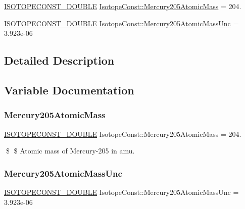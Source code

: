 \begin{DoxyCompactItemize}
\item 
\mbox{\hyperlink{group___isotope_const-_macros_ga8f45a7272ce02c0b4c65c44636ed719a}{I\+S\+O\+T\+O\+P\+E\+C\+O\+N\+S\+T\+\_\+\+D\+O\+U\+B\+LE}} \mbox{\hyperlink{group___isotope_const-_mercury-_hg205_ga63abaaa0ba631111b4eaba91d704e1a4}{Isotope\+Const\+::\+Mercury205\+Atomic\+Mass}} = 204.
\item 
\mbox{\hyperlink{group___isotope_const-_macros_ga8f45a7272ce02c0b4c65c44636ed719a}{I\+S\+O\+T\+O\+P\+E\+C\+O\+N\+S\+T\+\_\+\+D\+O\+U\+B\+LE}} \mbox{\hyperlink{group___isotope_const-_mercury-_hg205_ga1b22f4b4ebc1ce241f6eedf06662e9b5}{Isotope\+Const\+::\+Mercury205\+Atomic\+Mass\+Unc}} = 3.\+923e-\/06
\end{DoxyCompactItemize}


\subsection{Detailed Description}


\subsection{Variable Documentation}
\mbox{\label{group___isotope_const-_mercury-_hg205_ga63abaaa0ba631111b4eaba91d704e1a4}} 
\subsubsection{\texorpdfstring{Mercury205\+Atomic\+Mass}{Mercury205AtomicMass}}
{\footnotesize\ttfamily \mbox{\hyperlink{group___isotope_const-_macros_ga8f45a7272ce02c0b4c65c44636ed719a}{I\+S\+O\+T\+O\+P\+E\+C\+O\+N\+S\+T\+\_\+\+D\+O\+U\+B\+LE}} Isotope\+Const\+::\+Mercury205\+Atomic\+Mass = 204.}

\$ \$ Atomic mass of Mercury-\/205 in amu. \mbox{\label{group___isotope_const-_mercury-_hg205_ga1b22f4b4ebc1ce241f6eedf06662e9b5}} 
\subsubsection{\texorpdfstring{Mercury205\+Atomic\+Mass\+Unc}{Mercury205AtomicMassUnc}}
{\footnotesize\ttfamily \mbox{\hyperlink{group___isotope_const-_macros_ga8f45a7272ce02c0b4c65c44636ed719a}{I\+S\+O\+T\+O\+P\+E\+C\+O\+N\+S\+T\+\_\+\+D\+O\+U\+B\+LE}} Isotope\+Const\+::\+Mercury205\+Atomic\+Mass\+Unc = 3.\+923e-\/06}

